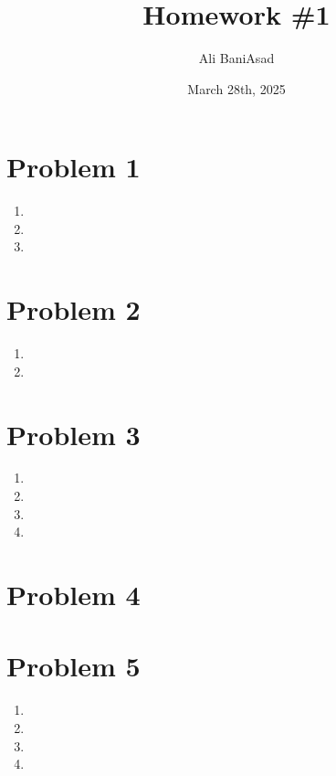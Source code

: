 \documentclass[12]{fphw}
\title{Homework \#1} %
\author{Ali BaniAsad} %
\date{March 28th, 2025} %
\institute{Sharif University of Technology \\ Institute of Aerospace} %
\begin{document}
\maketitle %
\section*{Problem 1}
\begin{enumerate}[label=(\alph*)]
	\item 
	
	\newpage
	\item 
	
	\newpage
	\item 
	
\end{enumerate}
\newpage
\section*{Problem 2}

\begin{enumerate}[label=(\alph*)]
	\item 
	
	\item 
	
\end{enumerate}


\newpage
\section*{Problem 3}

\begin{enumerate}[label=(\alph*)]
	\item 
	
	\item 
	
	\item 
	
	\item 
	
\end{enumerate}
\section*{Problem 4}

\section*{Problem 5}
\begin{enumerate}[label=(\alph*)]
	\item 
	
	\item	
	\item 
	
	\item 
	
\end{enumerate}
\end{document}
